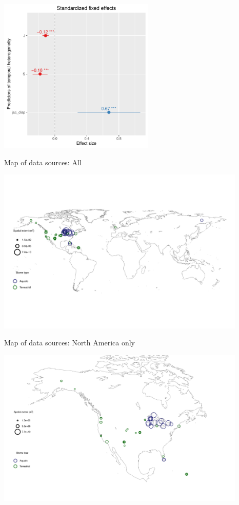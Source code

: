 \documentclass[11pt]{article}
\begin{document}
\includegraphics[width=280px]{pa-evenness}


Map of data sources: All

\includegraphics[width=450px]{BigMap}

Map of data sources: North America only

\includegraphics[width=450px]{NAmap1}
\end{document}
